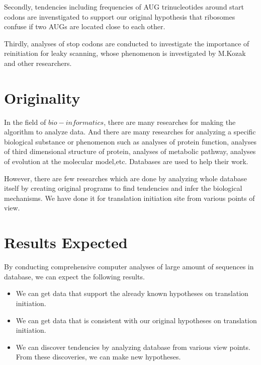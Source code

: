 Secondly, tendencies including frequencies of AUG trinucleotides
around start codons are invenstigated to support our original
hypothesis that ribosomes confuse if two AUGs are located close to
each other.

Thirdly, analyses of stop codons are conducted to investigate the
importance of reinitiation for leaky scanning, whose phenomenon is
investigated by M.Kozak\cite{label18} and other researchers. 

\section{Originality}

In the field of $bio-informatics$, there are many researches for making
the algorithm to analyze data. And there are many researches for analyzing
a specific biological substance or phenomenon such as analyses of protein 
function, analyses of third dimensional structure of protein, analyses
of metabolic pathway, analyses of evolution at the molecular model,etc. 
Databases are used to help their work.

However, there are few researches which are done by analyzing whole database
itself by creating original programs to find tendencies and infer the
biological mechanisms.
We have done it for translation initiation site from various points of view.




\section{Results Expected}

By conducting comprehensive computer analyses of large amount of sequences
in database, we can expect the following results.

\begin{itemize}

\item We can get data that support the already known hypotheses on
translation initiation.
\item We can get data that is consistent with our original hypotheses
on translation initiation. 
\item We can discover tendencies by analyzing database from various
view points. From these discoveries, we can make new hypotheses.

\end{itemize}

